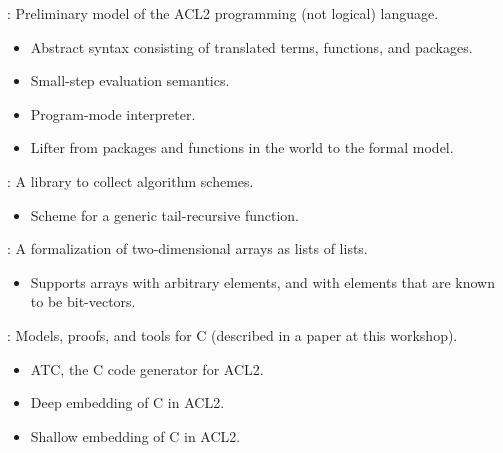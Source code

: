 
\begin{frame}[fragile]

\newlibtitle

:
Preliminary model of the ACL2 programming (not logical) language.
\begin{itemize}
\item Abstract syntax consisting of translated terms, functions, and packages.
\item Small-step evaluation semantics.
\item Program-mode interpreter.
\item Lifter from packages and functions in the world to the formal model.
\end{itemize}

\end{frame}


\begin{frame}

\newlibtitle

:
A library to collect algorithm schemes.
\begin{itemize}
\item Scheme for a generic tail-recursive function.
\end{itemize}

\end{frame}


\begin{frame}

\newlibtitle

:
A formalization of two-dimensional arrays as lists of lists.
\begin{itemize}
\item Supports arrays with arbitrary elements, and with elements that
  are known to be bit-vectors.
\end{itemize}

\end{frame}


\begin{frame}

\newlibtitle

:
Models, proofs, and tools for C (described in a paper at this workshop).
\begin{itemize}
\item ATC, the C code generator for ACL2.
\item Deep embedding of C in ACL2.
\item Shallow embedding of C in ACL2.
\end{itemize}

\end{frame}

